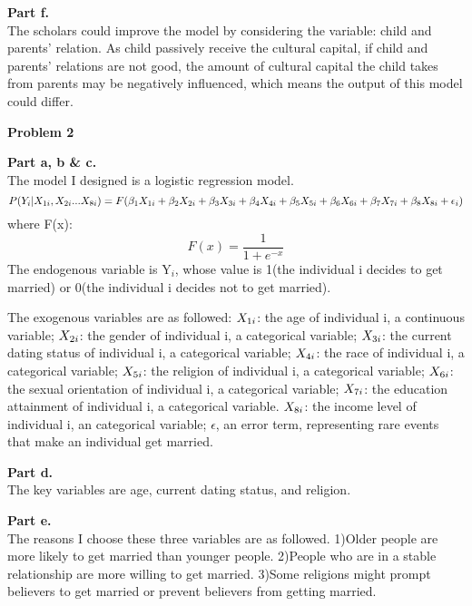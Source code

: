 \documentclass[letterpaper,12pt]{article}
\theoremstyle{definition}
\begin{document}
\textbf{Part f.} \\
The scholars could improve the model by considering the variable: child and parents' relation. As child passively receive the cultural capital, if child and parents' relations are not good, the amount of cultural capital the child takes from parents may be negatively influenced, which means the output of this model could differ.  

\newpage
\noindent\textbf{Problem 2}

\textbf{Part a, b \& c.} \\
The model I designed is a logistic regression model.
\begin{equation*}
  \MakeUppercase{p}(\MakeUppercase{y}_{i}|\MakeUppercase{x}_{1i},\MakeUppercase{x}_{2i}...\MakeUppercase{x}_{8i}) =\MakeUppercase{f}(\beta_{1} \MakeUppercase{x}_{1i}+  \beta_{2}\MakeUppercase{x}_{2i} + \beta_{3}\MakeUppercase{x}_{3i} + \beta_{4}\MakeUppercase{x}_{4i} + \beta_{5}\MakeUppercase{x}_{5i} + 
  \beta_{6}\MakeUppercase{x}_{6i} + \beta_{7}\MakeUppercase{x}_{7i} + \beta_{8}\MakeUppercase{x}_{8i} + \epsilon_{i})
\end{equation*}
where F(x):
\begin{equation*}
F(x)=  \frac{1}{1+e^{-x}}
\end{equation*}
The endogenous variable is Y$_{i}$, whose value is 1(the individual i decides to get married) or 0(the individual i decides not to get married).

The exogenous variables are as followed:
$\MakeUppercase{x}_{1i}$: the age of individual i, a continuous variable; $\MakeUppercase{x}_{2i}$: the gender of individual i, a categorical variable;
$\MakeUppercase{x}_{3i}$: the current dating status of individual i, a categorical variable;
$\MakeUppercase{x}_{4i}$: the race of individual i, a categorical variable; $\MakeUppercase{x}_{5i}$: the religion of individual i, a categorical variable;
$\MakeUppercase{x}_{6i}$: the sexual orientation of individual i, a categorical variable;
$\MakeUppercase{x}_{7i}$: the education attainment of individual i, a categorical variable.
$\MakeUppercase{x}_{8i}$: the income level of individual i, an categorical variable; $\epsilon$, an error term, representing rare events that make an individual get married.

\textbf{Part d.} \\
The key variables are age, current dating status, and religion. 

\textbf{Part e.} \\
The reasons I choose these three variables are as followed. 1)Older people are more likely to get married than younger people. 2)People who are in a stable relationship are more willing to get married. 3)Some religions might prompt believers to get married or prevent believers from getting married.
\end{document}
